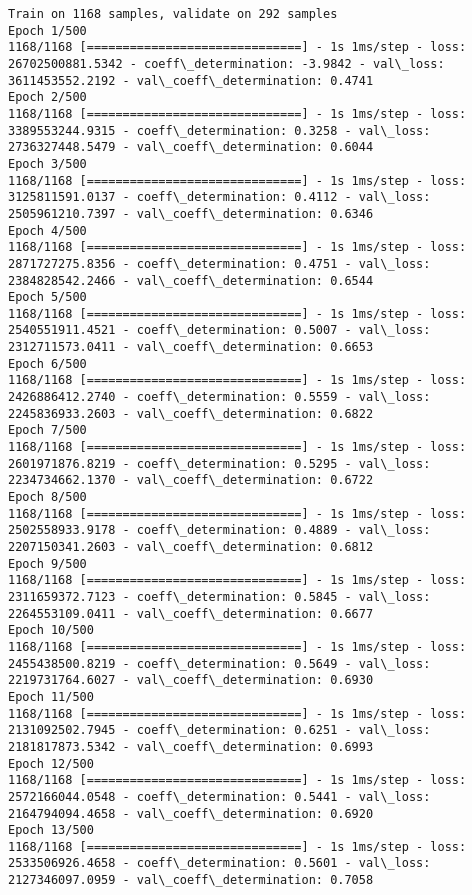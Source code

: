 \documentclass[11pt]{article}
\begin{document}
    \begin{Verbatim}[commandchars=\\\{\}]
Train on 1168 samples, validate on 292 samples
Epoch 1/500
1168/1168 [==============================] - 1s 1ms/step - loss: 26702500881.5342 - coeff\_determination: -3.9842 - val\_loss: 3611453552.2192 - val\_coeff\_determination: 0.4741
Epoch 2/500
1168/1168 [==============================] - 1s 1ms/step - loss: 3389553244.9315 - coeff\_determination: 0.3258 - val\_loss: 2736327448.5479 - val\_coeff\_determination: 0.6044
Epoch 3/500
1168/1168 [==============================] - 1s 1ms/step - loss: 3125811591.0137 - coeff\_determination: 0.4112 - val\_loss: 2505961210.7397 - val\_coeff\_determination: 0.6346
Epoch 4/500
1168/1168 [==============================] - 1s 1ms/step - loss: 2871727275.8356 - coeff\_determination: 0.4751 - val\_loss: 2384828542.2466 - val\_coeff\_determination: 0.6544
Epoch 5/500
1168/1168 [==============================] - 1s 1ms/step - loss: 2540551911.4521 - coeff\_determination: 0.5007 - val\_loss: 2312711573.0411 - val\_coeff\_determination: 0.6653
Epoch 6/500
1168/1168 [==============================] - 1s 1ms/step - loss: 2426886412.2740 - coeff\_determination: 0.5559 - val\_loss: 2245836933.2603 - val\_coeff\_determination: 0.6822
Epoch 7/500
1168/1168 [==============================] - 1s 1ms/step - loss: 2601971876.8219 - coeff\_determination: 0.5295 - val\_loss: 2234734662.1370 - val\_coeff\_determination: 0.6722
Epoch 8/500
1168/1168 [==============================] - 1s 1ms/step - loss: 2502558933.9178 - coeff\_determination: 0.4889 - val\_loss: 2207150341.2603 - val\_coeff\_determination: 0.6812
Epoch 9/500
1168/1168 [==============================] - 1s 1ms/step - loss: 2311659372.7123 - coeff\_determination: 0.5845 - val\_loss: 2264553109.0411 - val\_coeff\_determination: 0.6677
Epoch 10/500
1168/1168 [==============================] - 1s 1ms/step - loss: 2455438500.8219 - coeff\_determination: 0.5649 - val\_loss: 2219731764.6027 - val\_coeff\_determination: 0.6930
Epoch 11/500
1168/1168 [==============================] - 1s 1ms/step - loss: 2131092502.7945 - coeff\_determination: 0.6251 - val\_loss: 2181817873.5342 - val\_coeff\_determination: 0.6993
Epoch 12/500
1168/1168 [==============================] - 1s 1ms/step - loss: 2572166044.0548 - coeff\_determination: 0.5441 - val\_loss: 2164794094.4658 - val\_coeff\_determination: 0.6920
Epoch 13/500
1168/1168 [==============================] - 1s 1ms/step - loss: 2533506926.4658 - coeff\_determination: 0.5601 - val\_loss: 2127346097.0959 - val\_coeff\_determination: 0.7058

\end{Verbatim}
\end{document}
